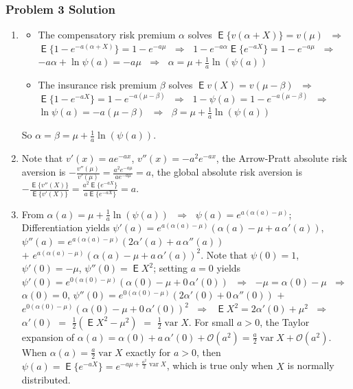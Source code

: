 \documentclass[10pt]{beamer}
\newcommand{\ds}{\displaystyle}
\newcommand{\ie}{\;\Longrightarrow\;}
\DeclareMathOperator\expc{\mathsf{E}}
\DeclareMathOperator\var{var}
\theoremstyle{definition}
\begin{document}
\begin{frame}[allowframebreaks]
  \frametitle{Problem 3 Solution}
  \begin{enumerate}
    \item 
      \begin{itemize}
        \item The compensatory risk premium $\alpha$ solves $\expc\big\{v(\alpha + X)\big\} = v(\mu)$ $\ie$ $\expc\big\{1 - e^{-a(\alpha + X)}\big\} = 1 - e^{-a\mu}$ $\ie$ $1 - e^{-a\alpha}\expc\big\{e^{-aX}\big\} = 1 - e^{-a\mu}$ $\ie$ $-a\alpha + \ln\psi(a) = -a\mu$ $\ie$ $\ds\alpha = \mu + \frac{1}{a}\ln(\psi(a))$
        \item The insurance risk premium $\beta$ solves $\expc{v(X)} = v(\mu - \beta)$ $\ie$ $\expc\big\{1 - e^{-a X}\big\} = 1 - e^{-a(\mu - \beta)}$ $\ie$ $1 - \psi(a) = 1 - e^{-a(\mu - \beta)}$ $\ie$ $\ln\psi(a) = -a(\mu - \beta)$ $\ie$ $\ds\beta = \mu + \frac{1}{a}\ln(\psi(a))$
      \end{itemize}
      So $\ds\alpha = \beta = \mu + \frac{1}{a}\ln(\psi(a))$.
    \item Note that $\ds v'(x) = ae^{-ax}$, $\ds v''(x) = -a^2e^{-ax}$, the Arrow-Pratt absolute risk aversion is $\ds -\frac{v''(\mu)}{v'(\mu)} = \frac{a^2e^{-a\mu}}{ae^{-a\mu}} = a$, the global absolute risk aversion is $\ds -\frac{\expc\big\{v''(X)\big\}}{\expc\big\{v'(X)\big\}} = \frac{a^2\expc\big\{e^{-a X}\big\}}{a\expc\big\{e^{-a X}\big\}} = a$.
    \item From $\ds\alpha(a) = \mu + \frac{1}{a}\ln(\psi(a))$ $\ie$ $\ds\psi(a) = e^{a(\alpha(a) - \mu)}$; Differentiation yields $\ds\psi'(a) = e^{a(\alpha(a) - \mu)}(\alpha(a) - \mu + a\,\alpha'(a))$, $\ds\psi''(a) = e^{a(\alpha(a) - \mu)}(2\alpha'(a) + a\,\alpha''(a))$ \\ $+$ $\ds e^{a(\alpha(a) - \mu)}(\alpha(a) - \mu + a\,\alpha'(a))^2$. Note that $\ds\psi(0) = 1$, $\ds\psi'(0) = -\mu$, $\ds\psi''(0) = \expc{X^2}$; setting $a = 0$ yields $\ds\psi'(0) = e^{0(\alpha(0) - \mu)}(\alpha(0) - \mu + 0\,\alpha'(0))$ $\ie$ $\ds-\mu = \alpha(0) - \mu$ $\ie$ $\ds\alpha(0) = 0$, $\ds\psi''(0) = e^{0(\alpha(0) - \mu)}(2\alpha'(0) + 0\,\alpha''(0))$ $+$ $\ds e^{0(\alpha(0) - \mu)}(\alpha(0) - \mu + 0\,\alpha'(0))^2$ $\ie$ $\ds\expc{X^2} = 2\alpha'(0) + \mu^2$ $\ie$ $\ds\alpha'(0)$ $=$ $\ds\frac{1}{2}(\expc{X^2} - \mu^2)$ $=$ $\ds\frac{1}{2}\var{X}$. For small $a > 0$, the Taylor expansion of $\ds\alpha(a) = \alpha(0) + a\,\alpha'(0) + \mathcal{O}(a^2) = \frac{a}{2}\var{X} + \mathcal{O}(a^2)$. When $\ds\alpha(a) = \frac{a}{2}\var{X}$ exactly for $a > 0$, then $\ds\psi(a) = \expc\big\{e^{-aX}\big\} = e^{-a\mu + \frac{a^2}{2}\var{X}}$, which is true only when $X$ is normally distributed.

\end{enumerate}
\end{frame}
\end{document}
